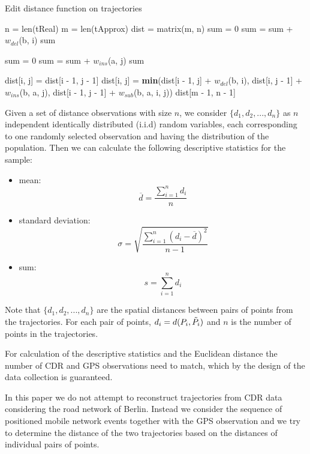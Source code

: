 \begin{algorithm}
\begin{algorithmic}
\caption{Edit distance function on trajectories} \label{algo:edit}
\State n = len(tReal)
\State m = len(tApprox) 
\State dist = matrix(m, n)
    \State sum = 0
        \State sum = sum + $w_{del}$(b, i)
    \EndFor
    \Return sum
\EndIf

    \State sum = 0
        \State sum = sum + $w_{ins}$(a, j)
    \EndFor
    \Return sum
\EndIf

                \State dist[i, j] = dist[i - 1, j - 1]
            \Else
                \State dist[i, j] = \textbf{min}(dist[i - 1, j] + $w_{del}$(b, i), dist[i, j - 1] + $w_{ins}$(b, a, j), dist[i - 1, j - 1] + $w_{sub}$(b, a, i, j))
            \EndIf
        \EndFor
    \EndFor
    \Return dist[m - 1, n - 1]
\EndIf
\EndFunction
\end{algorithmic}
\end{algorithm}


Given a set of distance observations with size $n$, we consider $\{d_{1}, d_{2}, ..., d_{n}\}$ as $n$ independent identically distributed (i.i.d) random variables, each corresponding to one randomly selected observation and having the distribution of the population. Then we can calculate the following descriptive statistics for the sample:
\begin{itemize}
    \item mean:
     \[ \overline {d} = \frac{\sum_{i=1}^{n} d_{i}}{n}\]
     \item standard deviation:
    \[ \sigma={\sqrt {\frac {\sum _{i=1}^{n}(d_{i}-{\overline {d}})^{2}}{n-1}}}\]
    \item sum:        
    \[s = \sum_{i=1}^{n} d_{i}\]
\end{itemize}

Note that $\{d_{1}, d_{2}, ..., d_{n}\}$ are the spatial distances between pairs of points from the trajectories. For each pair of points, $d_{i} = d(P_{i},\Tilde{P_{i}})$ and $n$ is the number of points in the trajectories.

For calculation of the descriptive statistics and the Euclidean distance the number of CDR and GPS observations need to match, which by the design of the data collection is guaranteed.

In this paper we do not attempt to reconstruct trajectories from CDR data considering the road network of Berlin. Instead we consider the sequence of positioned mobile network events together with the GPS observation and we try to determine the distance of the two trajectories based on the distances of individual pairs of points.



